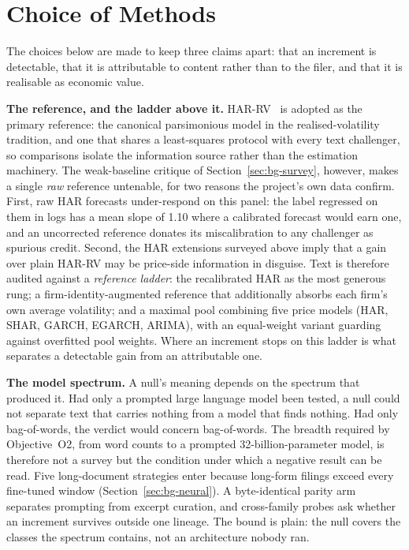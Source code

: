 \section{Choice of Methods}
\label{sec:bg-choice}

The choices below are made to keep three claims apart: that an increment is detectable, that it is attributable to content rather than to the filer, and that it is realisable as economic value.

\textbf{The reference, and the ladder above it.} HAR-RV~\cite{corsi2009har} is adopted as the primary reference: the canonical parsimonious model in the realised-volatility tradition, and one that shares a least-squares protocol with every text challenger, so comparisons isolate the information source rather than the estimation machinery. The weak-baseline critique of Section~\ref{sec:bg-survey}, however, makes a single \emph{raw} reference untenable, for two reasons the project's own data confirm. First, raw HAR forecasts under-respond on this panel: the label regressed on them in logs has a mean slope of 1.10 %
where a calibrated forecast would earn one, and an uncorrected reference donates its miscalibration to any challenger as spurious credit. Second, the HAR extensions surveyed above imply that a gain over plain HAR-RV may be price-side information in disguise. Text is therefore audited against a \emph{reference ladder}: the recalibrated HAR as the most generous rung; a firm-identity-augmented reference that additionally absorbs each firm's own average volatility; and a maximal pool combining five price models %
(HAR, SHAR, GARCH, EGARCH, ARIMA), with an equal-weight variant guarding against overfitted pool weights. Where an increment stops on this ladder is what separates a detectable gain from an attributable one.

\textbf{The model spectrum.} A null's meaning depends on the spectrum that produced it. Had only a prompted large language model been tested, a null could not separate text that carries nothing from a model that finds nothing. Had only bag-of-words, the verdict would concern bag-of-words. The breadth required by Objective~O2, from word counts to a prompted 32-billion-parameter model, is therefore not a survey but the condition under which a negative result can be read. %
Five long-document strategies enter because long-form filings exceed every fine-tuned window (Section~\ref{sec:bg-neural}). A byte-identical parity arm separates prompting from excerpt curation, and cross-family probes ask whether an increment survives outside one lineage. %
The bound is plain: the null covers the classes the spectrum contains, not an architecture nobody ran.

